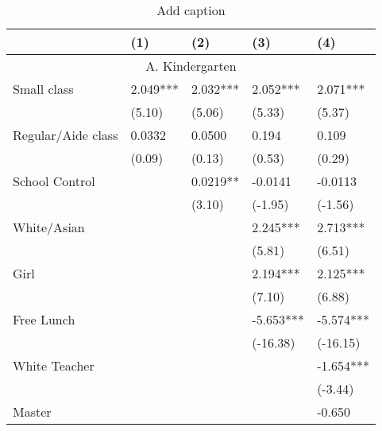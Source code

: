 \documentclass{article}
\begin{document}
{{{{{{{{{{{%
\begin{table}[htbp]
  \centering
  \caption{Add caption}
  \label{tab:sub8}
    \begin{tabular}{lrllrr}
    \toprule
          &       & (1)   & (2)   & \multicolumn{1}{l}{(3)} & \multicolumn{1}{l}{(4)} \\
    \midrule
    \multicolumn{6}{c}{A. Kindergarten} \\
    \multicolumn{2}{l}{Small class} & 2.049*** & 2.032*** & \multicolumn{1}{l}{2.052***} & \multicolumn{1}{l}{2.071***} \\
          &       & (5.10) & (5.06) & \multicolumn{1}{l}{(5.33)} & \multicolumn{1}{l}{(5.37)} \\
    \multicolumn{2}{l}{Regular/Aide class} & 0.0332 & 0.0500 & \multicolumn{1}{l}{0.194} & \multicolumn{1}{l}{0.109} \\
          &       & (0.09) & (0.13) & \multicolumn{1}{l}{(0.53)} & \multicolumn{1}{l}{(0.29)} \\
    \multicolumn{2}{l}{School Control} &       & 0.0219** & \multicolumn{1}{l}{-0.0141} & \multicolumn{1}{l}{-0.0113} \\
          &       &       & (3.10) & \multicolumn{1}{l}{(-1.95)} & \multicolumn{1}{l}{(-1.56)} \\
    \multicolumn{2}{l}{White/Asian} &       &       & \multicolumn{1}{l}{2.245***} & \multicolumn{1}{l}{2.713***} \\
          &       &       &       & \multicolumn{1}{l}{(5.81)} & \multicolumn{1}{l}{(6.51)} \\
    \multicolumn{2}{l}{Girl} &       &       & \multicolumn{1}{l}{2.194***} & \multicolumn{1}{l}{2.125***} \\
          &       &       &       & \multicolumn{1}{l}{(7.10)} & \multicolumn{1}{l}{(6.88)} \\
    \multicolumn{2}{l}{Free Lunch} &       &       & \multicolumn{1}{l}{-5.653***} & \multicolumn{1}{l}{-5.574***} \\
          &       &       &       & \multicolumn{1}{l}{(-16.38)} & \multicolumn{1}{l}{(-16.15)} \\
    \multicolumn{2}{l}{White Teacher} &       &       & \multicolumn{1}{l}{} & \multicolumn{1}{l}{-1.654***} \\
          &       &       &       & \multicolumn{1}{l}{} & \multicolumn{1}{l}{(-3.44)} \\
    \multicolumn{2}{l}{Master} &       &       & \multicolumn{1}{l}{} & \multicolumn{1}{l}{-0.650} \\

\end{tabular}
\end{table}}}}}}}}}}}}
\end{document}
